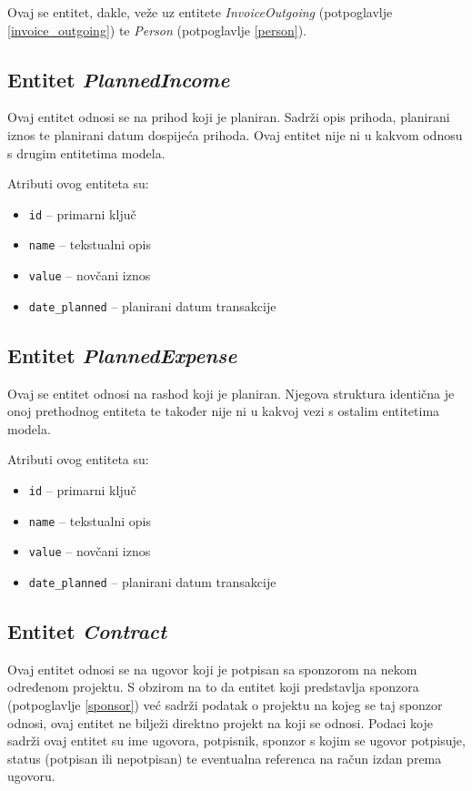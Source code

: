 \documentclass[times, utf8, diplomski]{fer}
\begin{document}
Ovaj se entitet, dakle, veže uz entitete \emph{InvoiceOutgoing} (potpoglavlje
\ref{invoice_outgoing}) te \emph{Person} (potpoglavlje \ref{person}).

\subsection{Entitet \emph{PlannedIncome}} \label{planned_income}

Ovaj entitet odnosi se na prihod koji je planiran. Sadrži opis prihoda,
planirani iznos te planirani datum dospijeća prihoda. Ovaj entitet nije ni u
kakvom odnosu s drugim entitetima modela.

\medskip
Atributi ovog entiteta su:
\begin{itemize}
    \item \texttt{id} -- primarni ključ
    \item \texttt{name} -- tekstualni opis
    \item \texttt{value} -- novčani iznos
    \item \texttt{date\_planned} -- planirani datum transakcije
\end{itemize}

\subsection{Entitet \emph{PlannedExpense}} \label{planned_expense}

Ovaj se entitet odnosi na rashod koji je planiran. Njegova struktura identična
je onoj prethodnog entiteta te također nije ni u kakvoj vezi s ostalim
entitetima modela.

\medskip
Atributi ovog entiteta su:
\begin{itemize}
    \item \texttt{id} -- primarni ključ
    \item \texttt{name} -- tekstualni opis
    \item \texttt{value} -- novčani iznos
    \item \texttt{date\_planned} -- planirani datum transakcije
\end{itemize}

\subsection{Entitet \emph{Contract}} \label{contract}

Ovaj entitet odnosi se na ugovor koji je potpisan sa sponzorom na nekom
određenom projektu. S obzirom na to da entitet koji predstavlja sponzora
(potpoglavlje \ref{sponsor}) već sadrži podatak o projektu na kojeg se taj
sponzor odnosi, ovaj entitet ne bilježi direktno projekt na koji se odnosi.
Podaci koje sadrži ovaj entitet su ime ugovora, potpisnik, sponzor s kojim se
ugovor potpisuje, status (potpisan ili nepotpisan) te eventualna referenca na
račun izdan prema ugovoru.
\end{document}
